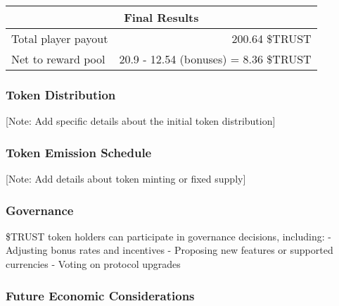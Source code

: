 \documentclass[]{article}
\begin{document}
\begin{table}[h]
\centering
\begin{tabular}{lr}
\multicolumn{2}{c}{\textbf{Final Results}} \\
\hline
Total player payout & 200.64 \$TRUST \\
Net to reward pool & 20.9 - 12.54 (bonuses) = 8.36 \$TRUST \\
\hline
\end{tabular}
\end{table}

\hypertarget{token-distribution}{%
\subsubsection{Token Distribution}\label{token-distribution}}

{[}Note: Add specific details about the initial token distribution{]}

\hypertarget{token-emission-schedule}{%
\subsubsection{Token Emission
Schedule}\label{token-emission-schedule}}

{[}Note: Add details about token minting or fixed supply{]}

\hypertarget{governance}{%
\subsubsection{Governance}\label{governance}}

\$TRUST token holders can participate in governance decisions,
including: - Adjusting bonus rates and incentives - Proposing new
features or supported currencies - Voting on protocol upgrades

\hypertarget{future-economic-considerations}{%
\subsubsection{Future Economic
Considerations}\label{future-economic-considerations}}
\end{document}
